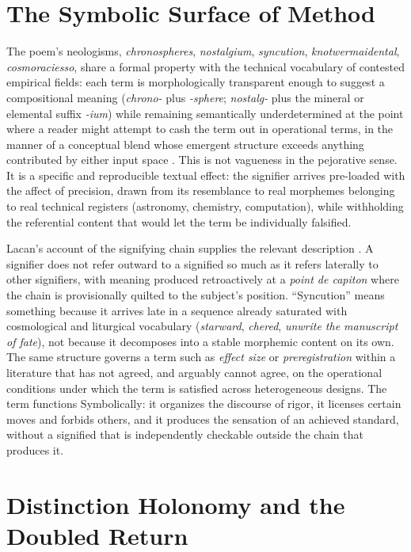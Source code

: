 \documentclass[11pt]{article}
\begin{document}
\section{The Symbolic Surface of Method}

The poem's neologisms, \emph{chronospheres}, \emph{nostalgium}, \emph{syncution}, \emph{knotwermaidental}, \emph{cosmoraciesso}, share a formal property with the technical vocabulary of contested empirical fields: each term is morphologically transparent enough to suggest a compositional meaning (\emph{chrono-} plus \emph{-sphere}; \emph{nostalg-} plus the mineral or elemental suffix \emph{-ium}) while remaining semantically underdetermined at the point where a reader might attempt to cash the term out in operational terms, in the manner of a conceptual blend whose emergent structure exceeds anything contributed by either input space \cite{fauconnier}. This is not vagueness in the pejorative sense. It is a specific and reproducible textual effect: the signifier arrives pre-loaded with the affect of precision, drawn from its resemblance to real morphemes belonging to real technical registers (astronomy, chemistry, computation), while withholding the referential content that would let the term be individually falsified.

Lacan's account of the signifying chain supplies the relevant description \cite{lacan}. A signifier does not refer outward to a signified so much as it refers laterally to other signifiers, with meaning produced retroactively at a \emph{point de capiton} where the chain is provisionally quilted to the subject's position. ``Syncution'' means something because it arrives late in a sequence already saturated with cosmological and liturgical vocabulary (\emph{starward}, \emph{chered}, \emph{unwrite the manuscript of fate}), not because it decomposes into a stable morphemic content on its own. The same structure governs a term such as \emph{effect size} or \emph{preregistration} within a literature that has not agreed, and arguably cannot agree, on the operational conditions under which the term is satisfied across heterogeneous designs. The term functions Symbolically: it organizes the discourse of rigor, it licenses certain moves and forbids others, and it produces the sensation of an achieved standard, without a signified that is independently checkable outside the chain that produces it.

\section{Distinction Holonomy and the Doubled Return}
\end{document}
